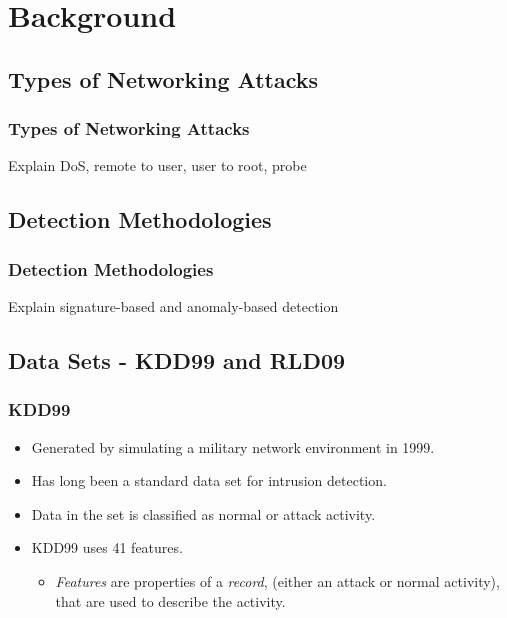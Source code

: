 \documentclass{beamer}
\newcommand{\linespace}{\vskip 0.25cm}
\begin{document}
\section[Background]{Background}
\subsection{Types of Networking Attacks}
\begin{frame}
  \frametitle{Types of Networking Attacks}
Explain DoS, remote to user, user to root, probe
\end{frame}


\subsection{Detection Methodologies}
\begin{frame}
  \frametitle{Detection Methodologies}
Explain signature-based and anomaly-based detection
\end{frame}


\subsection{Data Sets - KDD99 and RLD09}
\begin{frame}
  \frametitle{KDD99}
	\begin{itemize}
		\item Generated by simulating a military network environment in 1999.
		\item Has long been a standard data set for intrusion detection.
		\item Data in the set is classified as normal or attack activity.

		\linespace
		\linespace
		
		\item KDD99 uses 41 features.
		\begin{itemize}
		  	\item \emph{Features} are properties of a \emph{record}, (either an attack or normal activity), that are used to describe the activity.
		\end{itemize}

	\end{itemize}
\end{frame}
\end{document}
